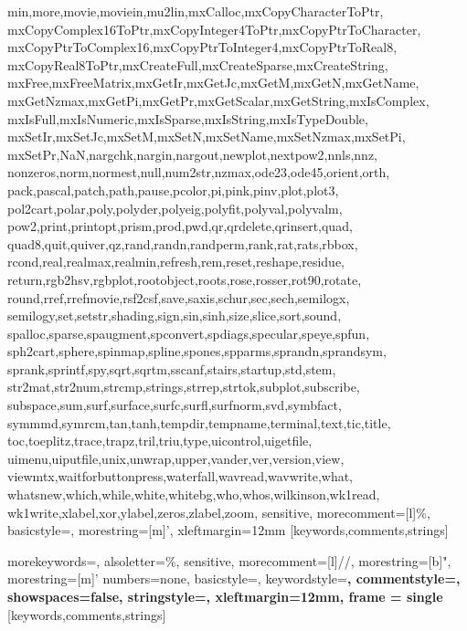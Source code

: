 {{      min,more,movie,moviein,mu2lin,mxCalloc,mxCopyCharacterToPtr,%
      mxCopyComplex16ToPtr,mxCopyInteger4ToPtr,mxCopyPtrToCharacter,%
      mxCopyPtrToComplex16,mxCopyPtrToInteger4,mxCopyPtrToReal8,%
      mxCopyReal8ToPtr,mxCreateFull,mxCreateSparse,mxCreateString,%
      mxFree,mxFreeMatrix,mxGetIr,mxGetJc,mxGetM,mxGetN,mxGetName,%
      mxGetNzmax,mxGetPi,mxGetPr,mxGetScalar,mxGetString,mxIsComplex,%
      mxIsFull,mxIsNumeric,mxIsSparse,mxIsString,mxIsTypeDouble,%
      mxSetIr,mxSetJc,mxSetM,mxSetN,mxSetName,mxSetNzmax,mxSetPi,%
      mxSetPr,NaN,nargchk,nargin,nargout,newplot,nextpow2,nnls,nnz,%
      nonzeros,norm,normest,null,num2str,nzmax,ode23,ode45,orient,orth,%
      pack,pascal,patch,path,pause,pcolor,pi,pink,pinv,plot,plot3,%
      pol2cart,polar,poly,polyder,polyeig,polyfit,polyval,polyvalm,%
      pow2,print,printopt,prism,prod,pwd,qr,qrdelete,qrinsert,quad,%
      quad8,quit,quiver,qz,rand,randn,randperm,rank,rat,rats,rbbox,%
      rcond,real,realmax,realmin,refresh,rem,reset,reshape,residue,%
      return,rgb2hsv,rgbplot,rootobject,roots,rose,rosser,rot90,rotate,%
      round,rref,rrefmovie,rsf2csf,save,saxis,schur,sec,sech,semilogx,%
      semilogy,set,setstr,shading,sign,sin,sinh,size,slice,sort,sound,%
      spalloc,sparse,spaugment,spconvert,spdiags,specular,speye,spfun,%
      sph2cart,sphere,spinmap,spline,spones,spparms,sprandn,sprandsym,%
      sprank,sprintf,spy,sqrt,sqrtm,sscanf,stairs,startup,std,stem,%
      str2mat,str2num,strcmp,strings,strrep,strtok,subplot,subscribe,%
      subspace,sum,surf,surface,surfc,surfl,surfnorm,svd,symbfact,%
      symmmd,symrcm,tan,tanh,tempdir,tempname,terminal,text,tic,title,%
      toc,toeplitz,trace,trapz,tril,triu,type,uicontrol,uigetfile,%
      uimenu,uiputfile,unix,unwrap,upper,vander,ver,version,view,%
      viewmtx,waitforbuttonpress,waterfall,wavread,wavwrite,what,%
      whatsnew,which,while,white,whitebg,who,whos,wilkinson,wk1read,%
      wk1write,xlabel,xor,ylabel,zeros,zlabel,zoom},%
   sensitive,%
   morecomment=[l]\%,%
   basicstyle=\footnotesize\ttfamily,%
   morestring=[m]',%
   xleftmargin=12mm
  }[keywords,comments,strings]%

%
  {morekeywords={},%
   alsoletter=\%,%
   sensitive,%
   morecomment=[l]//,%
   morestring=[b]",%
   morestring=[m]'%
   numbers=none,%
   basicstyle=\footnotesize\ttfamily,%
   keywordstyle=\bfseries,%
   commentstyle=\bfseries,%
   showspaces=false,%
   stringstyle=\bfseries, 
   xleftmargin=12mm,
   frame = single %
  }[keywords,comments,strings]%

\DeclareMathOperator{\lcm}{lcm} 

\usepackage[hmargin=3cm,vmargin=3cm]{geometry}


